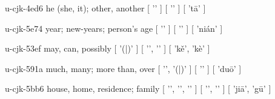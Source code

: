\begin{multicols}{2}
\lettrine[lines=3]{\cjkgGlue{}}{}\begin{minipage}{0.8\linewidth} u-cjk-4ed6  he (she, it); other, another  [ '\cjkgGlue{}' ]  [ '\cjkgGlue{}' ]  [ 'tā' ] \end{minipage}

\lettrine[lines=3]{\cjkgGlue{}}{}\begin{minipage}{0.8\linewidth} u-cjk-5e74  year; new-years; person's age  [ '\cjkgGlue{}' ]  [ '\cjkgGlue{}' ]  [ 'nián' ] \end{minipage}

\lettrine[lines=3]{\cjkgGlue{}}{}\begin{minipage}{0.8\linewidth} u-cjk-53ef  may, can, possibly  [ '\cjkgGlue{}(\cjkgGlue{}|\cjkgGlue{})' ]  [ '\cjkgGlue{}', '\cjkgGlue{}' ]  [ 'kě', 'kè' ] \end{minipage}

\lettrine[lines=3]{\cjkgGlue{}}{}\begin{minipage}{0.8\linewidth} u-cjk-591a  much, many; more than, over  [ '\cjkgGlue{}', '\cjkgGlue{}(\cjkgGlue{}|\cjkgGlue{})' ]  [ '\cjkgGlue{}' ]  [ 'duō' ] \end{minipage}

\lettrine[lines=3]{\cjkgGlue{}}{}\begin{minipage}{0.8\linewidth} u-cjk-5bb6  house, home, residence; family  [ '\cjkgGlue{}', '\cjkgGlue{}', '\cjkgGlue{}' ]  [ '\cjkgGlue{}', '\cjkgGlue{}' ]  [ 'jiā', 'gū' ] \end{minipage}


\end{multicols}
